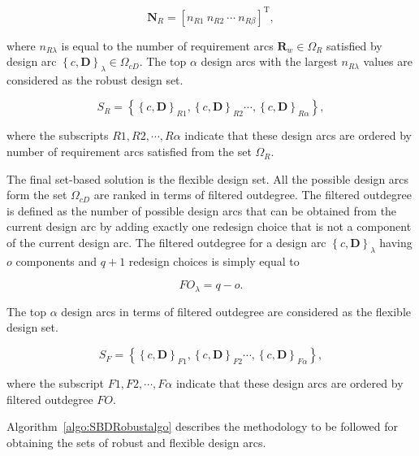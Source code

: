 \begin{equation} \label{eq:robustnessvec}
	\mathbf{N}_R = \left[n_{R1} ~ n_{R2} ~ \cdots ~ n_{R\beta}\right]^{\mathrm{T}},
\end{equation}

where $n_{R\lambda}$ is equal to the number of requirement arcs $\mathbf{R}_w \in \Omega_R$ satisfied by design arc $\left\{c,\mathbf{D}\right\}_\lambda \in \Omega_{cD}$. The top $\alpha$ design arcs with the largest $n_{R\lambda}$ values are considered as the robust design set.

\begin{equation} \label{eq:SBDrobust}
	S_R = \left\{\left\{c,\mathbf{D}\right\}_{R1},\left\{c,\mathbf{D}\right\}_{R2}\cdots,\left\{c,\mathbf{D}\right\}_{R\alpha}\right\},
\end{equation}

where the subscripts $R1,R2,\cdots,R\alpha$ indicate that these design arcs are ordered by number of requirement arcs satisfied from the set $\Omega_R$.

The final set-based solution is the flexible design set. All the possible design arcs form the set $\Omega_{cD}$ are ranked in terms of filtered outdegree. The filtered outdegree is defined as the number of possible design arcs that can be obtained from the current design arc by adding exactly one redesign choice that is not a component of the current design arc. The filtered outdegree for a design arc $\left\{c,\mathbf{D}\right\}_\lambda$ having $o$ components and $q + 1$ redesign choices is simply equal to

\begin{equation} \label{eq:filteredoutdegree}
	FO_{\lambda} = q - o.
\end{equation}

The top $\alpha$ design arcs in terms of filtered outdegree are considered as the flexible design set.

\begin{equation} \label{eq:SBDflexible}
	S_F = \left\{\left\{c,\mathbf{D}\right\}_{F1},\left\{c,\mathbf{D}\right\}_{F2}\cdots,\left\{c,\mathbf{D}\right\}_{F\alpha}\right\},
\end{equation}

where the subscript $F1,F2,\cdots,F\alpha$ indicate that these design arcs are ordered by filtered outdegree $FO$.

Algorithm~\ref{algo:SBDRobustalgo} describes the methodology to be followed for obtaining the sets of robust and flexible design arcs.

